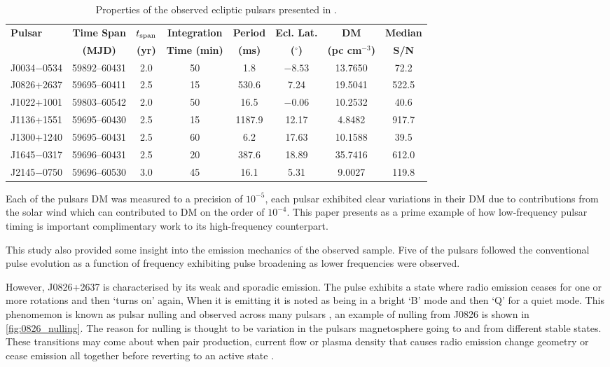 \begin{table}[htbp]
\centering
\begin{tabular}{lccccccc}
\toprule
\textbf{Pulsar} &
\textbf{Time Span} &
\textbf{$t_{\rm span}$} &
\textbf{Integration} &
\textbf{Period} &
\textbf{Ecl. Lat.} &
\textbf{DM} &
\textbf{Median} \\
&
\textbf{(MJD)} &
\textbf{(yr)} &
\textbf{Time (min)} &
\textbf{(ms)} &
\textbf{($^\circ$)} &
\textbf{(pc cm$^{-3}$)} &
\textbf{S/N} \\
\midrule
J0034$-$0534 & 59892--60431 & 2.0 & 50 & 1.8    & $-8.53$ & 13.7650 & 72.2  \\
J0826+2637   & 59695--60411 & 2.5 & 15 & 530.6  & 7.24    & 19.5041 & 522.5 \\
J1022+1001   & 59803--60542 & 2.0 & 50 & 16.5   & $-0.06$ & 10.2532 & 40.6  \\
J1136+1551   & 59695--60430 & 2.5 & 15 & 1187.9 & 12.17   & 4.8482  & 917.7 \\
J1300+1240   & 59695--60431 & 2.5 & 60 & 6.2    & 17.63   & 10.1588 & 39.5  \\
J1645$-$0317 & 59696--60431 & 2.5 & 20 & 387.6  & 18.89   & 35.7416 & 612.0 \\
J2145$-$0750 & 59696--60530 & 3.0 & 45 & 16.1   & 5.31    & 9.0027  & 119.8 \\
\bottomrule
\end{tabular}
\caption{Properties of the observed ecliptic pulsars presented in \cite{susarla_long-term_2025}.}
\label{tab:ecliptic_pulsars}
\end{table}

Each of the pulsars DM was measured to a precision of $10^{-5}$\dm, each pulsar exhibited clear variations in their DM due to contributions from the solar wind which can contributed to DM on the order of $10^{-4}$\dm. This paper presents as a prime example of how low-frequency pulsar timing is important complimentary work to its high-frequency counterpart. 

This study also provided some insight into the emission mechanics of the observed sample. Five of the pulsars followed the conventional pulse evolution as a function of frequency exhibiting pulse broadening as lower frequencies were observed. 

However, J0826+2637 is characterised by its weak and sporadic emission. The pulse exhibits a state where radio emission ceases for one or more rotations and then `turns on' again, When it is emitting it is noted as being in a bright `B' mode and then `Q' for a quiet mode. This phenomemon is known as pulsar nulling and observed across many pulsars \citep{keane_radio_2013}, an example of nulling from J0826 is shown in \cref{fig:0826_nulling}. The reason for nulling is thought to be variation in the pulsars magnetosphere going to and from different stable states. These transitions may come about when pair production, current flow or plasma density that causes radio emission change geometry or cease emission all together before reverting to an active state \citep{jaroenjittichai_geometry_2025}. 

